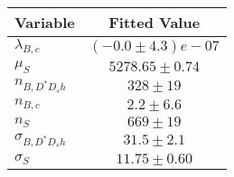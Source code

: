 \begin{tabular}[t]{lc}
\hline
Variable &Fitted Value\\
\hline\hline
$\lambda_{B,c}$&$(-0.0\pm4.3)e-07$\\
\hline
$\mu_S$&$5278.65\pm0.74$\\
\hline
$n_{B, D^* D_s h}$&$328\pm19$\\
\hline
$n_{B,c}$&$2.2\pm6.6$\\
\hline
$n_S$&$669\pm19$\\
\hline
$\sigma_{B, D^* D_s h}$&$31.5\pm2.1$\\
\hline
$\sigma_S$&$11.75\pm0.60$\\
\hline
\end{tabular}